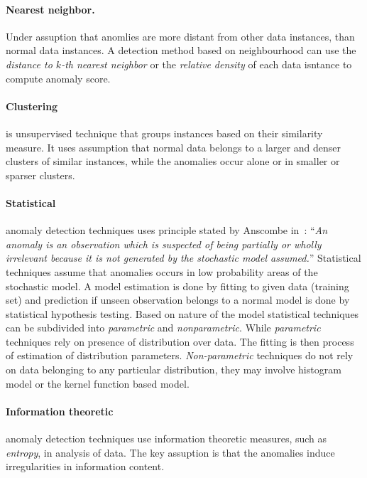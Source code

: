 \paragraph*{Nearest neighbor.} Under assuption that anomlies are more distant from other data instances, 
than normal data instances. A detection method based on neighbourhood can use the \emph{distance to $k$-th 
nearest neighbor} or the \emph{relative density} of each data isntance to compute anomaly score.

\paragraph*{Clustering} is unsupervised technique that groups instances based on their similarity measure.
It uses assumption that normal data belongs to a larger and denser clusters of similar instances, while the anomalies
occur alone or in smaller or sparser clusters.


\paragraph*{Statistical} anomaly detection techniques uses principle stated by Anscombe in~\cite{anscombe1960rejection}:
``\emph{An anomaly is an observation which is suspected of being partially or wholly irrelevant because it is not 
generated by the stochastic model assumed.}'' Statistical techniques assume that anomalies occurs in low probability 
areas of the stochastic model. A model estimation is done by fitting to given data (training set) and prediction
if unseen observation belongs to a normal model is done by statistical hypothesis testing.
Based on nature of the model statistical techniques can be subdivided into \emph{parametric} and \emph{nonparametric}.
While \emph{parametric} techniques rely on presence of distribution over data. The fitting is then process of
estimation of distribution parameters. \emph{Non-parametric} techniques do not rely on data belonging to any particular distribution,
they may involve histogram model or the kernel function based model.

\paragraph*{Information theoretic} anomaly detection techniques use information theoretic measures, such as \emph{entropy}, 
in analysis of data. The key assuption is that the anomalies induce irregularities in information content.

